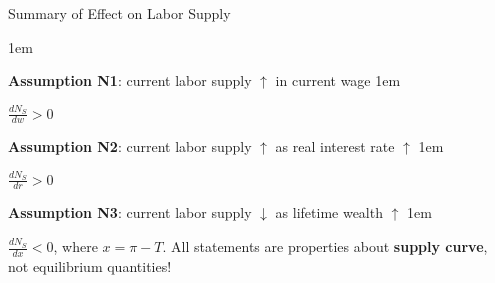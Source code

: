 \documentclass[11pt,aspectratio=43]{beamer}
\let\olditemize=\itemize
\let\endolditemize=\enditemize
\renewenvironment{itemize}{\olditemize \itemsep1em}{\endolditemize}
\theoremstyle{definition}
\begin{document}
\begin{frame}{Summary of Effect on Labor Supply}
\label{slide:Summary_of_Effect_on_Labor_Supply}

\begin{itemize}
    \item \textbf{Assumption N1}: current labor supply $ \uparrow  $ in current wage
    \begin{itemize}
        \item $ \frac{d N_{S}}{d w} > 0 $
    \end{itemize}
    \item \textbf{Assumption N2}: current labor supply $ \uparrow  $ as real interest rate $ \uparrow  $
    \begin{itemize}
        \item $ \frac{d N_{S}}{d r} > 0 $
    \end{itemize}
    \item \textbf{Assumption N3}: current labor supply $ \downarrow  $ as lifetime wealth $ \uparrow  $
    \begin{itemize}
        \item $ \frac{d N_{S}}{d x} < 0 $, where $ x = \pi - T $.
    \end{itemize}
\end{itemize}
\alert{All statements are properties about \textbf{supply curve}, not equilibrium quantities!}
\end{frame}
\end{document}
